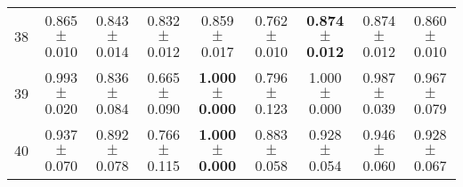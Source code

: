 \begin{table}[!ht]
{\begin{tabular}{r c c c c c c c c}
38 & 0.865 $\pm$ 0.010 & 0.843 $\pm$ 0.014 & 0.832 $\pm$ 0.012 & 0.859 $\pm$ 0.017 & 0.762 $\pm$ 0.010 & \textbf{0.874 $\pm$ 0.012} & 0.874 $\pm$ 0.012 & 0.860 $\pm$ 0.010 \\
39 & 0.993 $\pm$ 0.020 & 0.836 $\pm$ 0.084 & 0.665 $\pm$ 0.090 & \textbf{1.000 $\pm$ 0.000} & 0.796 $\pm$ 0.123 & 1.000 $\pm$ 0.000 & 0.987 $\pm$ 0.039 & 0.967 $\pm$ 0.079 \\
40 & 0.937 $\pm$ 0.070 & 0.892 $\pm$ 0.078 & 0.766 $\pm$ 0.115 & \textbf{1.000 $\pm$ 0.000} & 0.883 $\pm$ 0.058 & 0.928 $\pm$ 0.054 & 0.946 $\pm$ 0.060 & 0.928 $\pm$ 0.067 \\
\end{tabular}}
\end{table}
